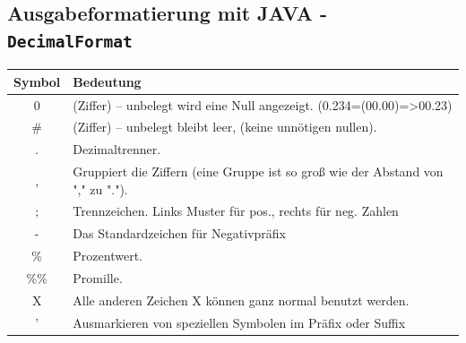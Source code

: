 \documentclass[10pt,a4paper,ngerman,oneside,]{article}
\begin{document}
\subsection{Ausgabeformatierung mit JAVA - \texttt{DecimalFormat}}
\begin{tabular}{cl}
Symbol & Bedeutung\\\hline
0 &	(Ziffer) – unbelegt wird eine Null angezeigt. (0.234=(00.00)=>00.23)\\
\# &	(Ziffer) – unbelegt bleibt leer, (keine unnötigen nullen).\\
. &	Dezimaltrenner. \\
, &	Gruppiert die Ziffern (eine Gruppe ist so groß wie der Abstand von "," zu ".").\\
; &	Trennzeichen. Links Muster für pos., rechts für neg. Zahlen\\
- &	Das Standardzeichen für Negativpräfix\\
\% &	Prozentwert.\\
\%\% &	Promille.\\
X &	Alle anderen Zeichen X können ganz normal benutzt werden.\\
' &	Ausmarkieren von speziellen Symbolen im Präfix oder Suffix \\
\end{tabular}
\end{document}
